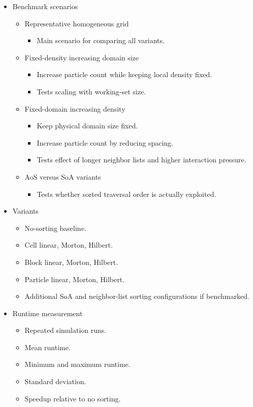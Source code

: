 \begin{itemize}
    \item Benchmark scenarios
    \begin{itemize}
        \item Representative homogeneous grid
        \begin{itemize}
            \item Main scenario for comparing all variants.
        \end{itemize}
        \item Fixed-density increasing domain size
        \begin{itemize}
            \item Increase particle count while keeping local density fixed.
            \item Tests scaling with working-set size.
        \end{itemize}
        \item Fixed-domain increasing density
        \begin{itemize}
            \item Keep physical domain size fixed.
            \item Increase particle count by reducing spacing.
            \item Tests effect of longer neighbor lists and higher interaction pressure.
        \end{itemize}
        \item AoS versus SoA variants
        \begin{itemize}
            \item Tests whether sorted traversal order is actually exploited.
        \end{itemize}
    \end{itemize}

    \item Variants
    \begin{itemize}
        \item No-sorting baseline.
        \item Cell linear, Morton, Hilbert.
        \item Block linear, Morton, Hilbert.
        \item Particle linear, Morton, Hilbert.
        \item Additional SoA and neighbor-list sorting configurations if benchmarked.
    \end{itemize}

    \item Runtime measurement
    \begin{itemize}
        \item Repeated simulation runs.
        \item Mean runtime.
        \item Minimum and maximum runtime.
        \item Standard deviation.
        \item Speedup relative to no sorting.
    \end{itemize}


\end{itemize}
